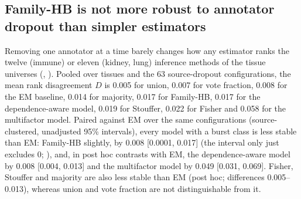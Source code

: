 \documentclass[11pt,a4paper]{article}
\begin{document}
\subsection{Family-HB is not more robust to annotator dropout than simpler estimators}\label{sec:res-robustness}

Removing one annotator at a time barely changes how any estimator ranks the twelve (immune) or eleven (kidney, lung) inference methods of the tissue universes (, ).
Pooled over tissues and the 63 source-dropout configurations, the mean rank disagreement $D$ is 0.005 for union, 0.007 for vote fraction, 0.008 for the EM baseline, 0.014 for majority, 0.017 for Family-HB, 0.017 for the dependence-aware model, 0.019 for Stouffer, 0.022 for Fisher and 0.058 for the multifactor model.
Paired against EM over the same configurations (source-clustered, unadjusted 95\% intervals), every model with a burst class is less stable than EM: Family-HB slightly, by 0.008 [0.0001, 0.017] (the interval only just excludes 0; ), and, in post hoc contrasts with EM, the dependence-aware model by 0.008 [0.004, 0.013] and the multifactor model by 0.049 [0.031, 0.069].
Fisher, Stouffer and majority are also less stable than EM (post hoc; differences 0.005--0.013), whereas union and vote fraction are not distinguishable from it.
\end{document}

